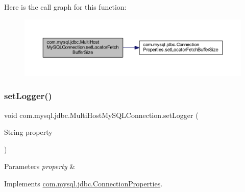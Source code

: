 Here is the call graph for this function\+:
\nopagebreak
\begin{figure}[H]
\begin{center}
\leavevmode
\includegraphics[width=350pt]{classcom_1_1mysql_1_1jdbc_1_1_multi_host_my_s_q_l_connection_a2c06dae5dc39a0e78d8f40f916376021_cgraph}
\end{center}
\end{figure}
\mbox{\label{classcom_1_1mysql_1_1jdbc_1_1_multi_host_my_s_q_l_connection_a8ff36862180722f5f43542808c8764f0}} 
\subsubsection{\texorpdfstring{set\+Logger()}{setLogger()}}
{\footnotesize\ttfamily void com.\+mysql.\+jdbc.\+Multi\+Host\+My\+S\+Q\+L\+Connection.\+set\+Logger (\begin{DoxyParamCaption}\item[{String}]{property }\end{DoxyParamCaption})}


\begin{DoxyParams}{Parameters}
{\em property} & \\
\hline
\end{DoxyParams}


Implements \mbox{\hyperlink{interfacecom_1_1mysql_1_1jdbc_1_1_connection_properties_a9ad6baf8983bc1bf352b58b0e1634be1}{com.\+mysql.\+jdbc.\+Connection\+Properties}}.

